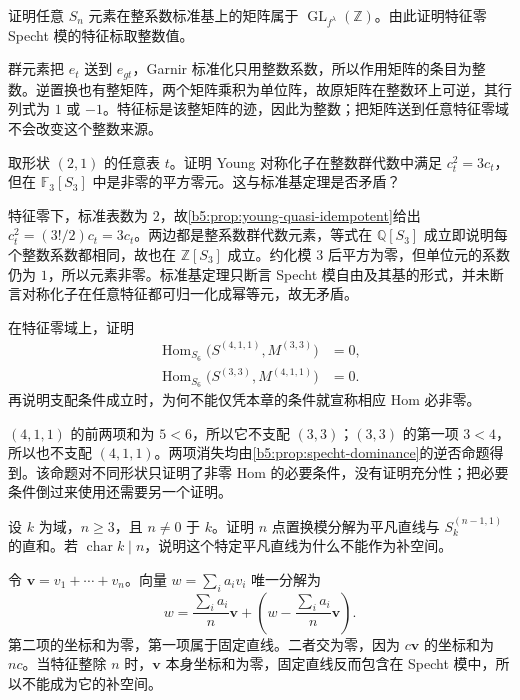 \begin{exercise}\label{b5:ex:06-standard-action-integral}
	证明任意 \(S_n\) 元素在整系数标准基上的矩阵属于 \(\operatorname{GL}_{f^\lambda}(\mathbb Z)\)。由此证明特征零 Specht 模的特征标取整数值。
\end{exercise}
\begin{solution}
	群元素把 \(e_t\) 送到 \(e_{gt}\)，Garnir 标准化只用整数系数，所以作用矩阵的条目为整数。逆置换也有整矩阵，两个矩阵乘积为单位阵，故原矩阵在整数环上可逆，其行列式为 \(1\) 或 \(-1\)。特征标是该整矩阵的迹，因此为整数；把矩阵送到任意特征零域不会改变这个整数来源。
\end{solution}

\begin{exercise}\label{b5:ex:06-young-mod-three}
	取形状 \((2,1)\) 的任意表 \(t\)。证明 Young 对称化子在整数群代数中满足 \(c_t^2=3c_t\)，但在 \(\mathbb F_3[S_3]\) 中是非零的平方零元。这与标准基定理是否矛盾？
\end{exercise}
\begin{solution}
	特征零下，标准表数为 \(2\)，故\cref{b5:prop:young-quasi-idempotent}给出 \(c_t^2=(3!/2)c_t=3c_t\)。两边都是整系数群代数元素，等式在 \(\mathbb Q[S_3]\) 成立即说明每个整数系数都相同，故也在 \(\mathbb Z[S_3]\) 成立。约化模 \(3\) 后平方为零，但单位元的系数仍为 \(1\)，所以元素非零。标准基定理只断言 Specht 模自由及其基的形式，并未断言对称化子在任意特征都可归一化成幂等元，故无矛盾。
\end{solution}

\begin{exercise}\label{b5:ex:06-dominance-incomparable}
	在特征零域上，证明
	\[
		\begin{aligned}
			\operatorname{Hom}_{S_6}\bigl(S^{(4,1,1)},M^{(3,3)}\bigr)&=0,\\
			\operatorname{Hom}_{S_6}\bigl(S^{(3,3)},M^{(4,1,1)}\bigr)&=0.
		\end{aligned}
	\]
	再说明支配条件成立时，为何不能仅凭本章的条件就宣称相应 Hom 必非零。
\end{exercise}
\begin{solution}
	\((4,1,1)\) 的前两项和为 \(5<6\)，所以它不支配 \((3,3)\)；\((3,3)\) 的第一项 \(3<4\)，所以也不支配 \((4,1,1)\)。两项消失均由\cref{b5:prop:specht-dominance}的逆否命题得到。该命题对不同形状只证明了非零 Hom 的必要条件，没有证明充分性；把必要条件倒过来使用还需要另一个证明。
\end{solution}

\begin{exercise}\label{b5:ex:06-permutation-split}
	设 \(k\) 为域，\(n\geq3\)，且 \(n\ne0\) 于 \(k\)。证明 \(n\) 点置换模分解为平凡直线与 \(S_k^{(n-1,1)}\) 的直和。若 \(\operatorname{char}k\mid n\)，说明这个特定平凡直线为什么不能作为补空间。
\end{exercise}
\begin{solution}
	令 \(\mathbf v=v_1+\cdots+v_n\)。向量 \(w=\sum_i a_iv_i\) 唯一分解为
	\[
		w=\frac{\sum_i a_i}{n}\mathbf v+ \left(w-\frac{\sum_i a_i}{n}\mathbf v\right).
	\]
	第二项的坐标和为零，第一项属于固定直线。二者交为零，因为 \(c\mathbf v\) 的坐标和为 \(nc\)。当特征整除 \(n\) 时，\(\mathbf v\) 本身坐标和为零，固定直线反而包含在 Specht 模中，所以不能成为它的补空间。
\end{solution}

